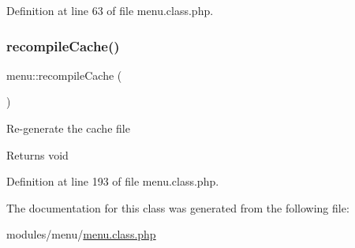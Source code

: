 Definition at line 63 of file menu.\+class.\+php.

\hypertarget{classmenu_a583aef0b15f6391d8e591f3498755f2e}{}\label{classmenu_a583aef0b15f6391d8e591f3498755f2e} 
\subsubsection{\texorpdfstring{recompile\+Cache()}{recompileCache()}}
{\footnotesize\ttfamily menu\+::recompile\+Cache (\begin{DoxyParamCaption}{ }\end{DoxyParamCaption})}

Re-\/generate the cache file \begin{DoxyReturn}{Returns}
void 
\end{DoxyReturn}


Definition at line 193 of file menu.\+class.\+php.



The documentation for this class was generated from the following file\+:\begin{DoxyCompactItemize}
\item 
modules/menu/\hyperlink{menu_8class_8php}{menu.\+class.\+php}\end{DoxyCompactItemize}
